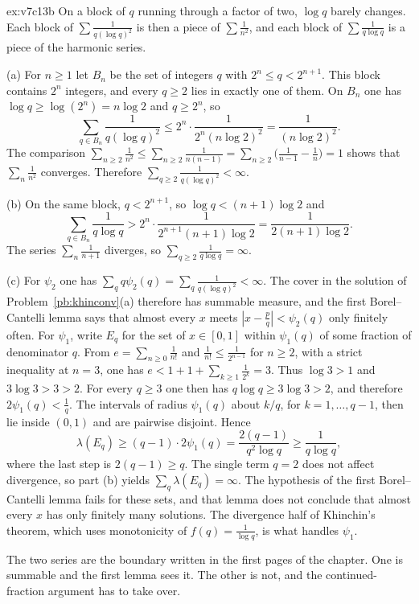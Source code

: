 \begin{solution}{ex:v7c13b}
\idea On a block of $q$ running through a factor of two, $\log q$ barely changes. Each block of $\sum\frac1{q(\log q)^2}$ is then a piece of $\sum\frac1{n^2}$, and each block of $\sum\frac1{q\log q}$ is a piece of the harmonic series.

\writeup (a) For $n\ge 1$ let $B_n$ be the set of integers $q$ with $2^n\le q<2^{n+1}$. This block contains $2^n$ integers, and every $q\ge 2$ lies in exactly one of them. On $B_n$ one has $\log q\ge\log(2^n)=n\log 2$ and $q\ge 2^n$, so
\[
\sum_{q\in B_n}\frac1{q(\log q)^2}\le 2^n\cdot\frac1{2^n(n\log 2)^2}=\frac1{(n\log 2)^2}.
\]
The comparison $\sum_{n\ge 2}\frac1{n^2}\le\sum_{n\ge 2}\frac1{n(n-1)}=\sum_{n\ge 2}\bigl(\frac1{n-1}-\frac1n\bigr)=1$ shows that $\sum_n\frac1{n^2}$ converges. Therefore $\sum_{q\ge 2}\frac1{q(\log q)^2}<\infty$.

(b) On the same block, $q<2^{n+1}$, so $\log q<(n+1)\log 2$ and
\[
\sum_{q\in B_n}\frac1{q\log q}>2^n\cdot\frac1{2^{n+1}(n+1)\log 2}=\frac1{2(n+1)\log 2}.
\]
The series $\sum_n\frac1{n+1}$ diverges, so $\sum_{q\ge 2}\frac1{q\log q}=\infty$.

(c) For $\psi_2$ one has $\sum_q q\psi_2(q)=\sum_q\frac1{q(\log q)^2}<\infty$. The cover in the solution of Problem~\ref{pb:khinconv}(a) therefore has summable measure, and the first Borel--Cantelli lemma says that almost every $x$ meets $|x-\frac pq|<\psi_2(q)$ only finitely often. For $\psi_1$, write $E_q$ for the set of $x\in[0,1]$ within $\psi_1(q)$ of some fraction of denominator $q$. From $e=\sum_{n\ge 0}\frac1{n!}$ and $\frac1{n!}\le\frac1{2^{n-1}}$ for $n\ge 2$, with a strict inequality at $n=3$, one has $e<1+1+\sum_{k\ge 1}\frac1{2^k}=3$. Thus $\log 3>1$ and $3\log 3>3>2$. For every $q\ge 3$ one then has $q\log q\ge 3\log 3>2$, and therefore $2\psi_1(q)<\frac1q$. The intervals of radius $\psi_1(q)$ about $k/q$, for $k=1,\dots,q-1$, then lie inside $(0,1)$ and are pairwise disjoint. Hence
\[
\lambda(E_q)\ge(q-1)\cdot 2\psi_1(q)=\frac{2(q-1)}{q^2\log q}\ge\frac1{q\log q},
\]
where the last step is $2(q-1)\ge q$. The single term $q=2$ does not affect divergence, so part (b) yields $\sum_q\lambda(E_q)=\infty$. The hypothesis of the first Borel--Cantelli lemma fails for these sets, and that lemma does not conclude that almost every $x$ has only finitely many solutions. The divergence half of Khinchin's theorem, which uses monotonicity of $f(q)=\frac1{\log q}$, is what handles $\psi_1$.

\leads The two series are the boundary written in the first pages of the chapter. One is summable and the first lemma sees it. The other is not, and the continued-fraction argument has to take over.
\end{solution}

